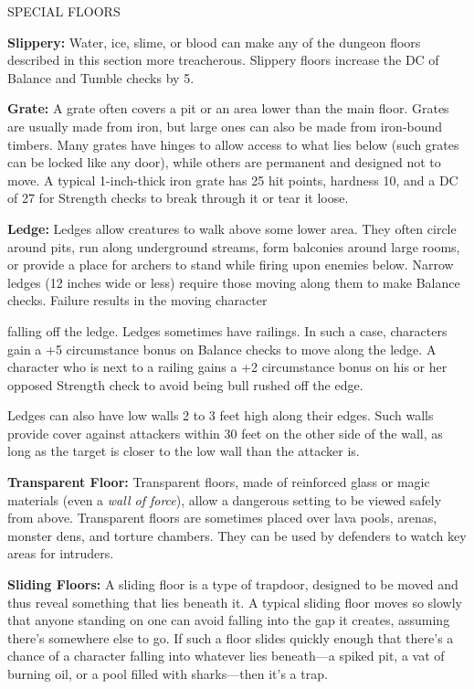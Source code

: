 \documentclass{article}
\begin{document}
\vspace{12pt}
SPECIAL FLOORS

\textbf{Slippery: }Water, ice, slime, or blood can make any of the dungeon floors 
described in this section more treacherous. Slippery floors increase the DC of 
Balance and Tumble checks by 5. 

\textbf{Grate: }A grate often covers a pit or an area lower than the main floor. 
Grates are usually made from iron, but large ones can also be made from iron-bound 
timbers. Many grates have hinges to allow access to what lies below (such grates 
can be locked like any door), while others are permanent and designed not to move. 
A typical 1-inch-thick iron grate has 25 hit points, hardness 10, and a DC of 27 
for Strength checks to break through it or tear it loose.

\textbf{Ledge: }Ledges allow creatures to walk above some lower area. They often 
circle around pits, run along underground streams, form balconies around large 
rooms, or provide a place for archers to stand while firing upon enemies below. 
Narrow ledges (12 inches wide or less) require those moving along them to make 
Balance checks. Failure results in the moving character

falling off the ledge. Ledges sometimes have railings. In such a case, characters 
gain a +5 circumstance bonus on Balance checks to move along the ledge. A character 
who is next to a railing gains a +2 circumstance bonus on his or her opposed Strength 
check to avoid being bull rushed off the edge.

Ledges can also have low walls 2 to 3 feet high along their edges. Such walls provide 
cover against attackers within 30 feet on the other side of the wall, as long as 
the target is closer to the low wall than the attacker is.

\textbf{Transparent Floor:}\textit{ }Transparent floors, made of reinforced glass 
or magic materials (even a \textit{wall of force}), allow a dangerous setting to 
be viewed safely from above. Transparent floors are sometimes placed over lava 
pools, arenas, monster dens, and torture chambers. They can be used by defenders 
to watch key areas for intruders.

\textbf{Sliding Floors:} A sliding floor is a type of trapdoor, designed to be 
moved and thus reveal something that lies beneath it. A typical sliding floor moves 
so slowly that anyone standing on one can avoid falling into the gap it creates, 
assuming there's somewhere else to go. If such a floor slides quickly enough that 
there's a chance of a character falling into whatever lies beneath---a spiked pit, 
a vat of burning oil, or a pool filled with sharks---then it's a trap.
\end{document}
